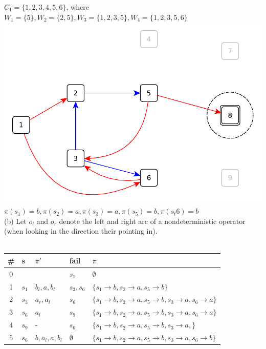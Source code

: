 \documentclass[11pt,a4paper]{article}
\begin{document}
$C_1=\{1,2,3,4,5,6\}$, where $W_1=\{5\},W_2=\{2,5\},W_3=\{1,2,3,5\},W_4=\{1,2,3,5,6\}$\\
\includegraphics[scale=0.4]{13_2_2.pdf}\\
$\pi(s_1)=b,\pi(s_2)=a,\pi(s_3)=a,\pi(s_5)=b,\pi(s_t6)=b$
\\
(b) Let $o_l$ and $o_r$ denote the left and right arc of a nondeterministic operator (when looking in the direction their pointing in).\\
\\
\begin{tabular}{c|l|l|l|l}
\# & s & $\pi'$ & fail & $\pi$ \\
\hline
0 & & & $s_1$ & $\emptyset$ \\
1 & $s_1$ & $b_l,a,b_l$ & $s_3,s_6$ & $\{s_1\to b,s_2\to a,s_5\to b\}$ \\
2 & $s_3$ & $a_r,a_l$ & $s_6$ & $\{s_1\to b,s_2\to a,s_5\to b,s_3\to a,s_6\to a\}$ \\
3 & $s_6$ & $a_l$ & $s_9$ & $\{s_1\to b,s_2\to a,s_5\to b,s_3\to a,s_6\to a\}$ \\
4 & $s_9$ & - & $s_6$ & $\{s_1\to b,s_2\to a,s_5\to b,s_3\to a,\}$ \\
5 & $s_6$ & $b,a_l,a,b_l$ & $\emptyset$ & $\{s_1\to b,s_2\to a,s_5\to b,s_3\to a,s_6\to b\}$ \\
\end{tabular}

\label{lastpage}
\end{document}

